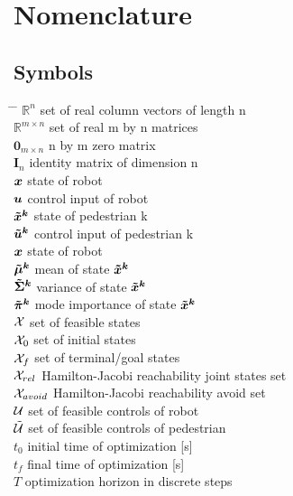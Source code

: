 \chapter*{Nomenclature}

\section*{Symbols}
\begin{tabbing}
\hspace*{1.6cm} \= \hspace*{8cm} \= \kill
$\mathbb{R}^n$ \> set of real column vectors of length n \\[0.5ex]
$\mathbb{R}^{m \times n}$ \> set of real m by n matrices \\[0.5ex]
$\mathbf{0}_{m \times n}$ \> n by m zero matrix \\[0.5ex]
$\mathbf{I}_n$ \> identity matrix of dimension n \\[0.5ex]
$\boldsymbol{x}$ \> state of robot \\[0.5ex]
$\boldsymbol{u}$ \> control input of robot \\[0.5ex]
$\xped[k]$ \> state of pedestrian k \\[0.5ex]
$\uped[k]$ \> control input of pedestrian k \\[0.5ex]
$\boldsymbol{x}$ \> state of robot \\[0.5ex]
$\muped[k]$ \> mean of state $\xped[k]$ \\[0.5ex]
$\sigmaped[k]$ \> variance of state $\xped[k]$ \\[0.5ex]
$\piped[k]$ \> mode importance of state $\xped[k]$ \\[0.5ex]
$\mathcal{X}$ \> set of feasible states \\[0.5ex]
$\mathcal{X}_0$ \> set of initial states \\[0.5ex]
$\mathcal{X}_f$ \> set of terminal/goal states \\[0.5ex]
$\mathcal{X}_{rel}$ \> Hamilton-Jacobi reachability joint states set \\[0.5ex]
$\mathcal{X}_{avoid}$ \> Hamilton-Jacobi reachability avoid set \\[0.5ex]
$\mathcal{U}$ \> set of feasible controls of robot \\[0.5ex]
$\mathcal{\tilde{U}}$ \> set of feasible controls of pedestrian \\[0.5ex]
$t_0$ \> initial time of optimization [s] \\[0.5ex]
$t_f$ \> final time of optimization [s] \\[0.5ex]
$T$ \> optimization horizon in discrete steps \\[0.5ex]

\end{tabbing}
